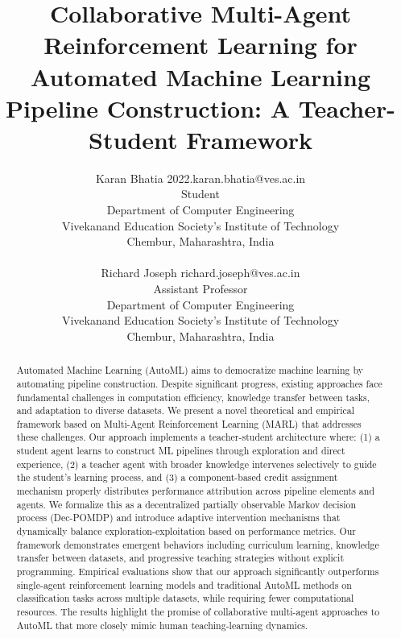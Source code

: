 \documentclass[twoside,11pt]{article}
\begin{document}
\title{Collaborative Multi-Agent Reinforcement Learning for Automated Machine Learning Pipeline Construction: A Teacher-Student Framework}
\author{\name Karan Bhatia
        \email 2022.karan.bhatia@ves.ac.in\\
        \addr Student\\ Department of Computer Engineering\\
        Vivekanand Education Society's Institute of Technology\\
        Chembur, Maharashtra, India\\ \\
        \name Richard Joseph \email richard.joseph@ves.ac.in\\
        \addr Assistant Professor\\ Department of Computer Engineering\\
        Vivekanand Education Society's Institute of Technology\\
        Chembur, Maharashtra, India\\
         }
\editor{}

\maketitle

\begin{abstract}%
Automated Machine Learning (AutoML) aims to democratize machine learning by automating pipeline construction. Despite significant progress, existing approaches face fundamental challenges in computation efficiency, knowledge transfer between tasks, and adaptation to diverse datasets. We present a novel theoretical and empirical framework based on Multi-Agent Reinforcement Learning (MARL) that addresses these challenges. Our approach implements a teacher-student architecture where: (1) a student agent learns to construct ML pipelines through exploration and direct experience, (2) a teacher agent with broader knowledge intervenes selectively to guide the student's learning process, and (3) a component-based credit assignment mechanism properly distributes performance attribution across pipeline elements and agents. We formalize this as a decentralized partially observable Markov decision process (Dec-POMDP) and introduce adaptive intervention mechanisms that dynamically balance exploration-exploitation based on performance metrics. Our framework demonstrates emergent behaviors including curriculum learning, knowledge transfer between datasets, and progressive teaching strategies without explicit programming. Empirical evaluations show that our approach significantly outperforms single-agent reinforcement learning models and traditional AutoML methods on classification tasks across multiple datasets, while requiring fewer computational resources. The results highlight the promise of collaborative multi-agent approaches to AutoML that more closely mimic human teaching-learning dynamics.
\end{abstract}
\end{document}
